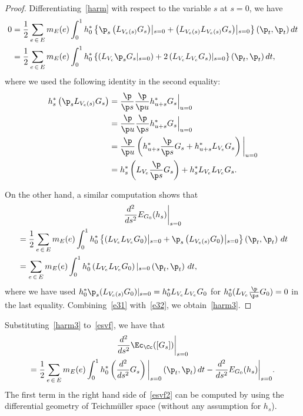 \begin{proof}
Differentiating~\eqref{harm} with respect to the variable $s$ at $s=0$, we have
\begin{equation}\label{e31}
\begin{aligned}
0&=\frac{1}{2}\sum_{e\,\in\,E}m_E(e)\int_{0}^1h^*_0\left\{{\p_s}\left(L_{V_e(s)}G_{s}\right)\middle|_{s=0} +\left(L_{V_e(s)}L_{V_e(s)}G_{s}\right)\middle|_{s=0}\right\}\left(\p_{t},\p_{t}\right)dt\\
&=\frac{1}{2}\sum_{e\,\in\,E}m_E(e)\int_{0}^1h_0^*\left\{\left(L_{V_e}{\p_s}G_{s}\middle|_{s=0}\right)+2\left(L_{V_e}L_{V_e}G_{s}\right)\middle|_{s=0}\right\}\left(\p_{t},\p_{t}\right)dt,
\end{aligned}
\end{equation}
where we used the following identity in the second equality:
\begin{align*}
h_s^*\left({\p_s}L_{V_e(s)}G_{s}\right) &=\frac{\p}{\p s}\frac{\p}{\p u}h_{u+s}^*G_{s}\Big|_{u=0}\\
&=\frac{\p}{\p u}\frac{\p}{\p s}h_{u+s}^*G_{s}\Big|_{u=0}\\
&=\frac{\p}{\p u}\left(h_{u+s}^*\frac{\p}{\p s}G_{s}+h^*_{u+s}L_{V_e}G_{s}\right)\bigg|_{u=0}\\
&=h_{s}^*\left(L_{V_e}\frac{\p}{\p s}G_{s}\right)+h_{s}^*L_{V_e}L_{V_e}G_{s}.
\end{align*}

On the other hand, a similar computation shows that
\begin{multline}\label{e32}
\frac{d^2}{d s^2}E_{G_{0}}(h_{s})\bigg|_{s=0}\\
\begin{aligned}
&=\frac{1}{2}\sum_{e\,\in\,E} m_E(e) \int_0^1 h_0^*\left\{\left(L_{V_e}L_{V_e}G_{0}\right)\middle|_{s=0}+\p_s\left(L_{V_e(s)}G_{0}\right)\middle|_{s=0}\right\}\left(\p_t,\p_t\right)\,dt\\
&=\sum_{e\,\in\,E} m_E(e) \int_0^1 h_0^*\left(L_{V_e}L_{V_e}G_{0}\right)|_{s=0}\left(\p_t,\p_t\right)\,dt,
\end{aligned}
\end{multline}
where we have used $h_0^\ast \p_s(L_{V_e(s)}G_{0})|_{s=0}=h_{0}^*L_{V_e}L_{V_e}G_{0}$ for $h_{0}^*(L_{V_e}\tfrac{\p}{\p s}G_{0})=0$ in the last equality. Combining~\eqref{e31} with~\eqref{e32}, we obtain~\eqref{harm3}.
\end{proof}



Substituting~\eqref{harm3} to~\eqref{esvf}, we have that
\begin{multline}\label{esvf2}
\frac{d^2}{d s^2}\Ec_{\Cc}([G_{s}])\bigg{|}_{s=0} \\
=\frac{1}{2}\sum_{e\,\in\,E}m_E(e)\int_{0}^1h_0^*\left(\frac{d^2}{d s^2}G_{s}\right)\bigg|_{s=0}\left(\p_t,\p_t\right)dt -\frac{d^2}{d s^2}E_{G_{0}}(h_{s})\bigg|_{s=0}.
\end{multline}
The first term in the right hand side of~\eqref{esvf2} can be computed by using the differential geometry of Teichm\"uller space (without any assumption for $h_{s}$).


